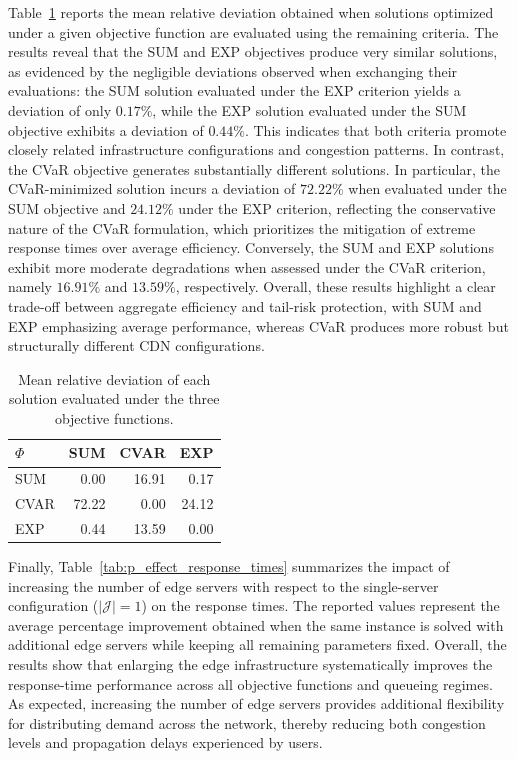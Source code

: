 \documentclass[a4paper,11pt,reqno]{amsart}
\newcommand{\J}{\mathcal{J}}
\begin{document}
Table~\ref{tab:objective_cross_deviation} reports the mean relative deviation obtained when solutions optimized under a given objective function are evaluated using the remaining criteria. The results reveal that the SUM and EXP objectives produce very similar solutions, as evidenced by the negligible deviations observed when exchanging their evaluations: the SUM solution evaluated under the EXP criterion yields a deviation of only $0.17\%$, while the EXP solution evaluated under the SUM objective exhibits a deviation of $0.44\%$. This indicates that both criteria promote closely related infrastructure configurations and congestion patterns. In contrast, the CVaR objective generates substantially different solutions. In particular, the CVaR-minimized solution incurs a deviation of $72.22\%$ when evaluated under the SUM objective and $24.12\%$ under the EXP criterion, reflecting the conservative nature of the CVaR formulation, which prioritizes the mitigation of extreme response times over average efficiency. Conversely, the SUM and EXP solutions exhibit more moderate degradations when assessed under the CVaR criterion, namely $16.91\%$ and $13.59\%$, respectively. Overall, these results highlight a clear trade-off between aggregate efficiency and tail-risk protection, with SUM and EXP emphasizing average performance, whereas CVaR produces more robust but structurally different CDN configurations.
\begin{table}
\begin{tabular}{lrrr}
\toprule
$\Phi$ & SUM & CVAR & EXP \\
\midrule
SUM & 0.00 & 16.91 & 0.17 \\
CVAR & 72.22 & 0.00 & 24.12 \\
EXP & 0.44 & 13.59 & 0.00 \\
\bottomrule
\end{tabular}
\caption{Mean relative deviation of each solution evaluated under the three objective functions.}
\label{tab:objective_cross_deviation}
\end{table}
Finally, Table~\ref{tab:p_effect_response_times} summarizes the impact of increasing the number of edge servers with respect to the single-server configuration ($|\J|=1$) on the response times. The reported values represent the average percentage improvement obtained when the same instance is solved with additional edge servers while keeping all remaining parameters fixed. Overall, the results show that enlarging the edge infrastructure systematically improves the response-time performance across all objective functions and queueing regimes. As expected, increasing the number of edge servers provides additional flexibility for distributing demand across the network, thereby reducing both congestion levels and propagation delays experienced by users.
\end{document}
